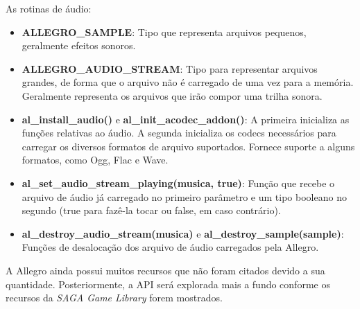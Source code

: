 % 
As rotinas de áudio:
%
\begin{itemize}
 \item \textbf{ALLEGRO\_SAMPLE}: Tipo que representa arquivos pequenos, geralmente efeitos sonoros.
 \item \textbf{ALLEGRO\_AUDIO\_STREAM}: Tipo para representar arquivos grandes, de forma que o arquivo não é carregado de uma vez para a 
 memória. Geralmente representa os arquivos que irão compor uma trilha sonora.
 \item \textbf{al\_install\_audio()} e \textbf{al\_init\_acodec\_addon()}: A primeira inicializa as funções relativas ao áudio. A segunda inicializa os 
 codecs necessários para carregar os diversos formatos de arquivo suportados. Fornece suporte a alguns formatos, como Ogg, Flac e Wave.
 \item \textbf{al\_set\_audio\_stream\_playing(musica, true)}: Função que recebe o arquivo de áudio já carregado no primeiro parâmetro e um tipo 
 booleano no segundo (true para fazê-la tocar ou false, em caso contrário).
 \item \textbf{al\_destroy\_audio\_stream(musica) } e \textbf{al\_destroy\_sample(sample)}: Funções de desalocação dos arquivo de áudio carregados 
 pela Allegro.
\end{itemize}
%
%
A Allegro ainda possui muitos recursos que não foram citados devido a sua quantidade. Posteriormente, a API será explorada mais a fundo conforme os recursos da \textit{SAGA Game Library} forem mostrados.
%
%

